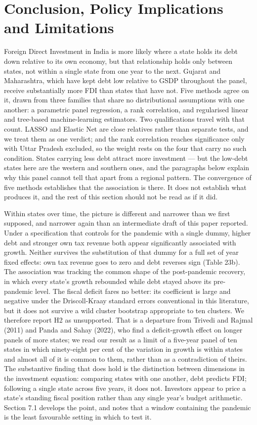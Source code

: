 \documentclass[12pt,a4paper]{article}
\begin{document}
\FloatBarrier
\section{Conclusion, Policy Implications and Limitations}

Foreign Direct Investment in India is more likely where a state holds its debt down relative to its own economy, but that relationship holds only between states, not within a single state from one year to the next. Gujarat and Maharashtra, which have kept debt low relative to GSDP throughout the panel, receive substantially more FDI than states that have not. Five methods agree on it, drawn from three families that share no distributional assumptions with one another: a parametric panel regression, a rank correlation, and regularised linear and tree-based machine-learning estimators. Two qualifications travel with that count. LASSO and Elastic Net are close relatives rather than separate tests, and we treat them as one verdict; and the rank correlation reaches significance only with Uttar Pradesh excluded, so the weight rests on the four that carry no such condition. States carrying less debt attract more investment --- but the low-debt states here are the western and southern ones, and the paragraphs below explain why this panel cannot tell that apart from a regional pattern. The convergence of five methods establishes that the association is there. It does not establish what produces it, and the rest of this section should not be read as if it did.

Within states over time, the picture is different and narrower than we first supposed, and narrower again than an intermediate draft of this paper reported. Under a specification that controls for the pandemic with a single dummy, higher debt and stronger own tax revenue both appear significantly associated with growth. Neither survives the substitution of that dummy for a full set of year fixed effects: own tax revenue goes to zero and debt reverses sign (Table 23b). The association was tracking the common shape of the post-pandemic recovery, in which every state's growth rebounded while debt stayed above its pre-pandemic level. The fiscal deficit fares no better: its coefficient is large and negative under the Driscoll-Kraay standard errors conventional in this literature, but it does not survive a wild cluster bootstrap appropriate to ten clusters. We therefore report H2 as unsupported. That is a departure from Trivedi and Rajmal (2011) and Panda and Sahay (2022), who find a deficit-growth effect on longer panels of more states; we read our result as a limit of a five-year panel of ten states in which ninety-eight per cent of the variation in growth is within states and almost all of it is common to them, rather than as a contradiction of theirs. The substantive finding that does hold is the distinction between dimensions in the investment equation: comparing states with one another, debt predicts FDI; following a single state across five years, it does not. Investors appear to price a state's standing fiscal position rather than any single year's budget arithmetic. Section 7.1 develops the point, and notes that a window containing the pandemic is the least favourable setting in which to test it.
\end{document}
